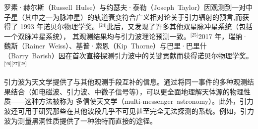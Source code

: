 罗素·赫尔斯（Russell~Hulse）与约瑟夫·泰勒（Joseph~Taylor）因观测到一对中子星（其中之一为脉冲星）的轨道衰变符合广义相对论关于引力辐射的预言,而获得了 1993 年诺贝尔物理学奖。\(^\text{[24]}\)此后，又发现了许多其他双星脉冲星系统（包括一个双脉冲星系统），
其观测结果均与引力波理论预测一致。\(^\text{[25]}\)2017 年，瑞纳·魏斯（Rainer~Weiss）、基普·索恩（Kip~Thorne）与巴里·巴里什（Barry~Barish）因在首次直接探测引力波中的关键贡献而获得诺贝尔物理学奖。\(^\text{[26][27][28]}\)

引力波为天文学提供了与其他观测手段互补的信息。通过将同一事件的多种观测结果结合（如电磁波、引力波、中微子信号等），可以更全面地理解天体源的物理性质——这种方法被称为 多信使天文学（multi-messenger~astronomy）。此外，引力波还可用于研究那些在其他波段几乎不可见甚至完全无法探测的系统。例如，引力波为测量黑洞性质提供了一种独特而直接的途径。


